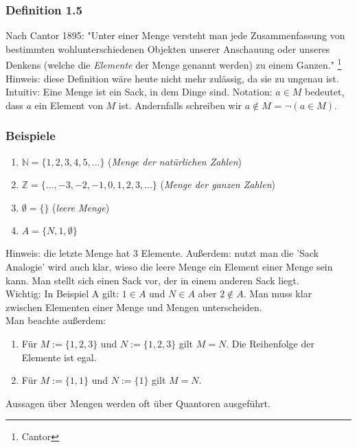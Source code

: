 \documentclass{article}
\begin{document}
\subsubsection*{Definition 1.5}

Nach Cantor 1895: "Unter einer Menge versteht man jede Zusammenfassung von bestimmten 
wohlunterschiedenen Objekten unserer Anschauung oder unseres Denkens (welche die \textit{Elemente} der Menge genannt werden) zu einem Ganzen." \footnote{Cantor} \\
Hinweis: diese Definition wäre heute nicht mehr zulässig, da sie zu ungenau ist. \\
Intuitiv: Eine Menge ist ein Sack, in dem Dinge sind. 
Notation: $a \in M$ bedeutet, dass $a$ ein Element von $M$ ist. Andernfalls schreiben wir $a \notin M$ = $\neg (a \in M)$. 

\subsubsection*{Beispiele}
\begin{enumerate}
    \item $\mathbb{N} = \{1, 2, 3, 4, 5, ...\}$ (\textit{Menge der natürlichen Zahlen})
    \item $\mathbb{Z} = \{..., -3, -2, -1, 0, 1, 2, 3, ...\}$ (\textit{Menge der ganzen Zahlen})
    \item $\emptyset = \{\}$ (\textit{leere Menge})
    \item $A = \{N, 1, \emptyset\}$
\end{enumerate} 

Hinweis: die letzte Menge hat 3 Elemente. Außerdem: nutzt man die 'Sack Analogie' wird auch klar, wieso die leere Menge ein Element einer Menge sein kann. Man stellt sich einen Sack vor, der in einem anderen Sack liegt. \\
Wichtig: In Beispiel A gilt: $1 \in A$ und $N \in A$ aber $2 \notin A$. Man muss klar zwischen Elementen einer Menge und Mengen unterscheiden. \\
Man beachte außerdem: 
\begin{enumerate}
    \item Für $M := \{1, 2, 3\}$ und $N := \{1, 2, 3\}$ gilt $M = N$. Die Reihenfolge der Elemente ist egal.
    \item Für $M := \{1, 1\}$ und $N := \{1\}$ gilt $M = N$. 
\end{enumerate} 

Aussagen über Mengen werden oft über Quantoren ausgeführt.
\end{document}
